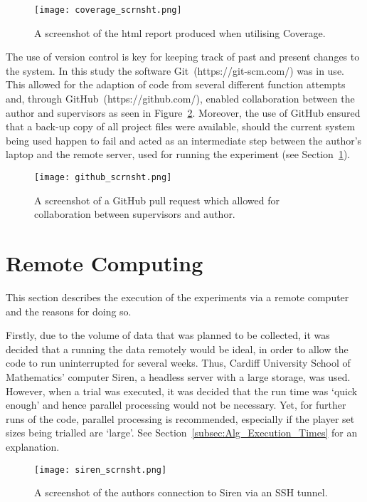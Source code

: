 \begin{figure}
    \centering
    \texttt{[image: coverage\_scrnsht.png]}
    \caption{A screenshot of the html report produced when utilising Coverage.}\label{fig:cov_scrnsht}
\end{figure}

The use of version control is key for keeping track of past and present changes 
to the system. In this study the software Git~(https://git-scm.com/) was in use. This allowed for the 
adaption of code from several different function attempts and, through GitHub~(https://github.com/), 
enabled collaboration between the author and supervisors as seen in Figure~\ref{fig:github_scrnsht}. 
Moreover, the use of GitHub ensured that a back-up copy of all project files 
were available, should the current system being used happen to fail and acted as
an intermediate step between the author's laptop and the remote server, used for
running the experiment (see Section~\ref{sec:Remote_Computing}).

\begin{figure}
    \centering
    \texttt{[image: github\_scrnsht.png]}
    \caption{A screenshot of a GitHub pull request which allowed for collaboration between supervisors and author.}\label{fig:github_scrnsht}
\end{figure}


\section{Remote Computing}\label{sec:Remote_Computing}
This section describes the execution of the experiments via a remote
computer and the reasons for doing so.

Firstly, due to the volume of data that was planned to be collected, it was
decided that a running the data remotely would be ideal, in order to allow the
code to run uninterrupted for several weeks. Thus, Cardiff University School of
Mathematics' computer Siren, a headless server with a large storage, was used. However, when a trial was executed,
it was decided that the run time was `quick enough' and hence parallel
processing would not be necessary. Yet, for further runs of the code, parallel
processing is recommended, especially if the player set sizes being trialled are
`large'. See Section~\ref{subsec:Alg_Execution_Times} for an explanation.

\begin{figure}
    \centering
    \texttt{[image: siren\_scrnsht.png]}
    \caption{A screenshot of the authors connection to Siren via an SSH tunnel.}\label{fig:siren_scrnsht}
\end{figure}


